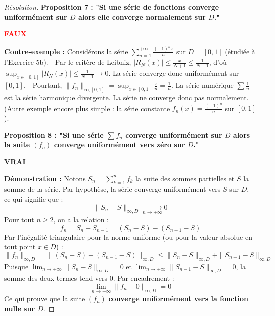 \documentclass[12pt,a4paper]{report}
\begin{document}
\begin{proof}[Résolution]
\vspace{0.3cm}
\textbf{Proposition 7 : "Si une série de fonctions converge uniformément sur $D$ alors elle converge normalement sur $D$."}
\begin{center}
\textbf{\textcolor{red}{FAUX}}
\end{center}
\textbf{Contre-exemple :} Considérons la série $\sum_{n=1}^{+\infty} \frac{(-1)^n x}{n}$ sur $D = [0, 1]$ (étudiée à l'Exercice 5b).
- Par le critère de Leibniz, $|R_N(x)| \le \frac{x}{N+1} \le \frac{1}{N+1}$, d'où $\sup_{x \in [0, 1]} |R_N(x)| \le \frac{1}{N+1} \to 0$. La série converge donc uniformément sur $[0, 1]$.
- Pourtant, $\|f_n\|_{\infty, [0, 1]} = \sup_{x \in [0, 1]} \frac{x}{n} = \frac{1}{n}$. La série numérique $\sum \frac{1}{n}$ est la série harmonique divergente. La série ne converge donc pas normalement.
(Autre exemple encore plus simple : la série constante $f_n(x) = \frac{(-1)^n}{n}$ sur $[0, 1]$).

\vspace{0.3cm}
\textbf{Proposition 8 : "Si une série $\sum f_n$ converge uniformément sur $D$ alors la suite $(f_n)$ converge uniformément vers zéro sur $D$."}
\begin{center}
\textbf{\textcolor{blue!80!black}{VRAI}}
\end{center}
\textbf{Démonstration :} Notons $S_n = \sum_{k=1}^n f_k$ la suite des sommes partielles et $S$ la somme de la série.
Par hypothèse, la série converge uniformément vers $S$ sur $D$, ce qui signifie que :
\[ \|S_n - S\|_{\infty, D} \xrightarrow[n \to +\infty]{} 0 \]
Pour tout $n \ge 2$, on a la relation :
\[ f_n = S_n - S_{n-1} = (S_n - S) - (S_{n-1} - S) \]
Par l'inégalité triangulaire pour la norme uniforme (ou pour la valeur absolue en tout point $x \in D$) :
\[ \|f_n\|_{\infty, D} = \|(S_n - S) - (S_{n-1} - S)\|_{\infty, D} \le \|S_n - S\|_{\infty, D} + \|S_{n-1} - S\|_{\infty, D} \]
Puisque $\lim_{n \to +\infty} \|S_n - S\|_{\infty, D} = 0$ et $\lim_{n \to +\infty} \|S_{n-1} - S\|_{\infty, D} = 0$, la somme des deux termes tend vers 0.
Par encadrement :
\[ \lim_{n \to +\infty} \|f_n - 0\|_{\infty, D} = 0 \]
Ce qui prouve que la suite $(f_n)$ \textbf{converge uniformément vers la fonction nulle sur $D$}.
\end{proof}
\end{document}

